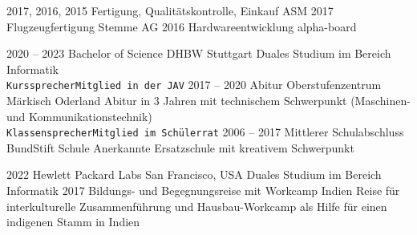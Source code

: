 \documentclass[9pt]{developercv} %
\begin{document}
\vspace{0.5cm}

\begin{entrylist}
	\entry
	{2017, 2016, 2015}
	{Fertigung, Qualitätskontrolle, Einkauf}
	{ASM}
	{\lorem}
	\entry
	{2017}
	{Flugzeugfertigung}
	{Stemme AG}
	{\lorem}
	\entry
	{2016}
	{Hardwareentwicklung}
	{alpha-board}
	{\lorem}
\end{entrylist}



\begin{entrylist}
	\entry
	{2020 -- 2023}
	{Bachelor of Science}
	{DHBW Stuttgart}
	{Duales Studium im Bereich Informatik\\ \texttt{Kurssprecher}\slashsep\texttt{Mitglied in der JAV}}
	\entry
	{2017 -- 2020}
	{Abitur}
	{Oberstufenzentrum Märkisch Oderland}
	{Abitur in 3 Jahren mit technischem Schwerpunkt (Maschinen- und Kommunikationstechnik)\\ \texttt{Klassensprecher}\slashsep\texttt{Mitglied im Schülerrat}}
	\entry
	{2006 -- 2017}
	{Mittlerer Schulabschluss}
	{BundStift Schule}
	{Anerkannte Ersatzschule mit kreativem Schwerpunkt}
\end{entrylist}



\begin{entrylist}
	\entry
	{2022}
	{Hewlett Packard Labs}
	{San Francisco, USA}
	{Duales Studium im Bereich Informatik}
	\entry
	{2017}
	{Bildungs- und Begegnungsreise mit Workcamp}
	{Indien}
	{Reise für interkulturelle Zusammenführung und Hausbau-Workcamp als Hilfe für einen indigenen Stamm in Indien}
\end{entrylist}

\end{document}

